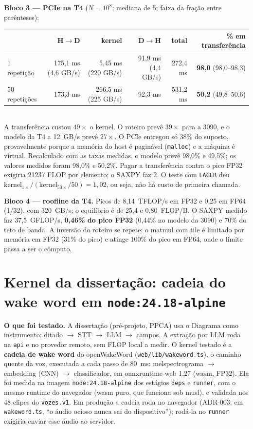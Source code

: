 \documentclass[10pt,a4paper]{article}
\begin{document}
\textbf{Bloco 3 — PCIe na T4} ($N=10^8$; mediana de 5; faixa da fração entre parênteses):\\[1pt]
{\small\begin{tabular}{@{}lrrrrr@{}}
\toprule
 & H$\to$D & kernel & D$\to$H & total & \% em transferência \\
\midrule
1 repetição & 175,1 ms (4,6 GB/s) & 5,45 ms (220 GB/s) & 91,9 ms (4,4 GB/s) & 272,4 ms & \textbf{98,0} (98,0–98,3) \\
50 repetições & 173,3 ms & 266,5 ms (225 GB/s) & 92,3 ms & 531,2 ms & \textbf{50,2} (49,8–50,6) \\
\bottomrule
\end{tabular}}\\[1pt]
A transferência custou $49\times$ o kernel. O roteiro prevê $39\times$ para a 3090, e o modelo da T4 a 12~GB/s prevê $27\times$.
O PCIe entregou só 38\% do suposto, provavelmente porque a memória do host é paginável (\texttt{malloc}) e a máquina é virtual.
Recalculado com as taxas medidas, o modelo prevê 98,0\% e 49,5\%; os valores medidos foram 98,0\% e 50,2\%.
Pagar a transferência contra o pico FP32 exigiria \num{21237} FLOP por elemento; o SAXPY faz 2.
O teste com \texttt{EAGER} deu $\text{kernel}_{1\times}/(\text{kernel}_{50\times}/50)=1{,}02$, ou seja, não há custo de primeira chamada.

\textbf{Bloco 4 — roofline da T4.} Picos de 8,14~TFLOP/s em FP32 e 0,25 em FP64 (1/32), com 320~GB/s; o equilíbrio é de 25,4 e 0,80~FLOP/B.
O SAXPY medido faz 37,5~GFLOP/s, \textbf{0,46\% do pico FP32} (0,44\% no modelo da 3090) e 70\% do teto de banda.
A inversão do roteiro se repete: o matmul com tile é limitado por memória em FP32 (31\% do pico) e atinge 100\% do pico em FP64, onde o limite passa a ser o cômputo.

\section{Kernel da dissertação: cadeia do wake word em \texttt{node:24.18-alpine}}
\textbf{O que foi testado.} A dissertação (pré-projeto, PPCA) usa o Diagrama como instrumento: ditado $\to$ STT $\to$ LLM $\to$ campos. A extração por LLM roda na \texttt{api} e no provedor remoto, sem FLOP local a medir.
O kernel testado é a \textbf{cadeia de wake word} do openWakeWord (\texttt{web/lib/wakeword.ts}), o caminho quente da voz, executada a cada passo de 80~ms: melspectrograma $\to$ embedding (CNN) $\to$ classificador, em onnxruntime-web 1.27 (wasm, FP32).
Ela foi medida na imagem \texttt{node:24.18-alpine} dos estágios \texttt{deps} e \texttt{runner}, com o mesmo runtime do navegador (wasm puro, que funciona sob musl), e validada nos 48 clipes do \texttt{vozes.v1}.
Em produção a cadeia roda no navegador (ADR-003; em \texttt{wakeword.ts}, ``o áudio ocioso nunca sai do dispositivo''); rodá-la no \texttt{runner} exigiria enviar esse áudio ao servidor.
\end{document}
